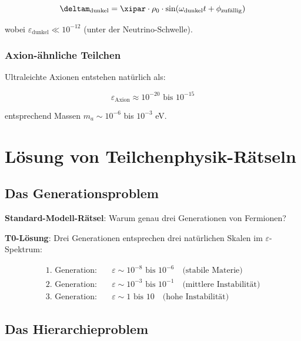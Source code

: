 	\begin{equation}
		\deltam_{\text{dunkel}} = \xipar \cdot \rho_0 \cdot \sin(\omega_{\text{dunkel}} t + \phi_{\text{zufällig}})
		\label{eq:dark_matter_field}
	\end{equation}
	
	wobei $\varepsilon_{\text{dunkel}} \ll 10^{-12}$ (unter der Neutrino-Schwelle).
	
	\subsubsection{Axion-ähnliche Teilchen}
	
	Ultraleichte Axionen entstehen natürlich als:
	
	\begin{equation}
		\varepsilon_{\text{Axion}} \approx 10^{-20} \text{ bis } 10^{-15}
		\label{eq:axion_epsilon}
	\end{equation}
	
	entsprechend Massen $m_a \sim 10^{-6}$ bis $10^{-3}$ eV.
	
	\section{Lösung von Teilchenphysik-Rätseln}
	
	\subsection{Das Generationsproblem}
	
	\textbf{Standard-Modell-Rätsel}: Warum genau drei Generationen von Fermionen?
	
	\textbf{T0-Lösung}: Drei Generationen entsprechen drei natürlichen Skalen im $\varepsilon$-Spektrum:
	
	\begin{align}
		\text{1. Generation}: \quad &\varepsilon \sim 10^{-8} \text{ bis } 10^{-6} \quad \text{(stabile Materie)} \\
		\text{2. Generation}: \quad &\varepsilon \sim 10^{-3} \text{ bis } 10^{-1} \quad \text{(mittlere Instabilität)} \\
		\text{3. Generation}: \quad &\varepsilon \sim 1 \text{ bis } 10 \quad \text{(hohe Instabilität)}
	\end{align}
	
	\subsection{Das Hierarchieproblem}
	

